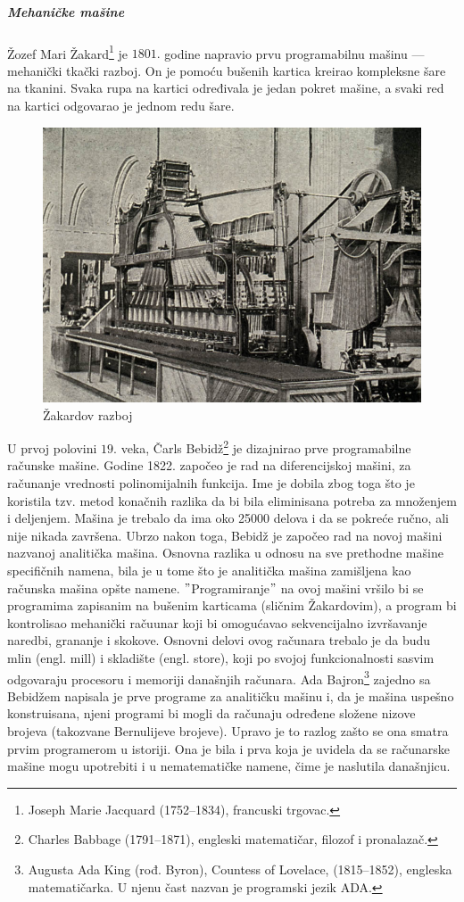 \documentclass[a4paper]{article}
\begin{document}
\subparagraph{Mehaničke mašine} Žozef Mari Žakard\footnote{Joseph Marie Jacquard (1752–1834), francuski trgovac.} je $1801.$ godine napravio prvu programabilnu mašinu — mehanički tkački razboj. On je pomoću bušenih kartica
kreirao kompleksne šare na tkanini. Svaka rupa na kartici određivala je jedan pokret mašine, a svaki red na kartici odgovarao je jednom redu šare.
\begin{figure}[h!]
\begin{center}
\includegraphics[scale=0.25]{pictures/loom.jpg}
\end{center}
\caption{Žakardov razboj}
\label{fig:jacques}
\end{figure}
U prvoj polovini $19.$ veka, Čarls Bebidž\footnote{Charles Babbage (1791–1871), engleski matematičar, filozof i pronalazač.} je dizajnirao prve programabilne računske mašine.  Godine 1822. započeo je rad na diferencijskoj mašini, za računanje vrednosti polinomijalnih funkcija. Ime je dobila zbog toga što je koristila tzv. metod konačnih razlika da bi bila eliminisana potreba za množenjem i deljenjem. Mašina je trebalo da ima oko 25000 delova i da se pokreće ručno, ali nije nikada završena.
Ubrzo nakon toga, Bebidž je započeo rad na novoj mašini nazvanoj analitička mašina. Osnovna razlika u
odnosu na sve prethodne mašine specifičnih namena, bila je u tome što je analitička mašina zamišljena kao računska mašina opšte namene. $"$Programiranje$"$  na ovoj mašini vršilo bi se programima zapisanim na bušenim karticama (sličnim Žakardovim), a program bi kontrolisao mehanički račuunar koji bi omogućavao sekvencijalno izvršavanje naredbi, grananje i skokove. Osnovni delovi ovog računara trebalo je da budu mlin (engl. mill) i skladište (engl. store), koji po svojoj funkcionalnosti sasvim odgovaraju procesoru i
memoriji današnjih računara. Ada Bajron\footnote{Augusta Ada King (rođ. Byron), Countess of Lovelace, (1815–1852), engleska matematičarka.
U njenu čast nazvan je programski jezik ADA.} zajedno sa Bebidžem napisala je
prve programe za analitičku mašinu i, da je mašina uspešno konstruisana, njeni
programi bi mogli da računaju određene složene nizove brojeva (takozvane Bernulijeve
brojeve). Upravo je to razlog zašto se ona smatra prvim programerom u istoriji. Ona je bila i prva koja je uvidela da se računarske mašine mogu upotrebiti i u nematematičke namene, čime je naslutila današnjicu.
\end{document}
